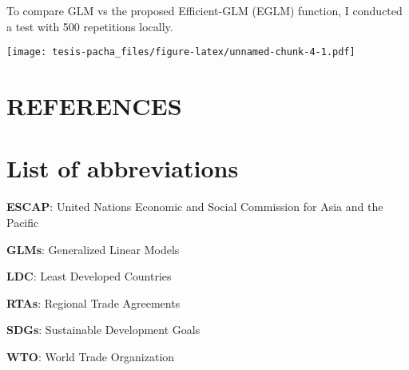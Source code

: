 \documentclass[12pt,reqno,oneside,pdftex]{formato-puc/puctesis} %
\begin{document}
To compare GLM vs the proposed Efficient-GLM (EGLM) function, I
conducted a test with 500 repetitions locally.

\texttt{[image: tesis-pacha\_files/figure-latex/unnamed-chunk-4-1.pdf]}

\chapter*{REFERENCES}

\appendix

\chapter{List of abbreviations}

\textbf{ESCAP}: United Nations Economic and Social Commission for Asia
and the Pacific

\textbf{GLMs}: Generalized Linear Models

\textbf{LDC}: Least Developed Countries

\textbf{RTAs}: Regional Trade Agreements

\textbf{SDGs}: Sustainable Development Goals

\textbf{WTO}: World Trade Organization
\end{document}
